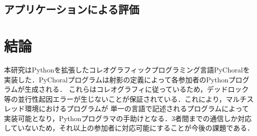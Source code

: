 \documentclass{resume}
\begin{document}
\subsection{アプリケーションによる評価}

\section{結論}
本研究はPythonを拡張したコレオグラフィックプログラミング言語PyChoralを実装した．PyChoralプログラムは射影の定義によって各参加者のPythonプログラムが生成される．
これらはコレオグラフィに従っているため，デッドロック等の並行性起因エラーが生じないことが保証されている．これにより，マルチスレッド環境におけるプログラムが
単一の言語で記述されるプログラムによって実装可能となり，Pythonプログラマの手助けとなる．3者間までの通信しか対応していないため，それ以上の参加者に対応可能にすることが今後の課題である．

\end{document}
